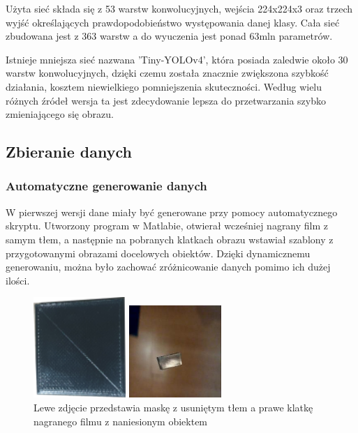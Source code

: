 Użyta sieć składa się z 53 warstw konwolucyjnych, wejścia 224x224x3 oraz trzech 
wyjść określających prawdopodobieństwo występowania danej klasy. 
Cała sieć zbudowana jest z 363 warstw a do wyuczenia jest ponad 63mln parametrów.

Istnieje mniejsza sieć nazwana 'Tiny-YOLOv4', która posiada zaledwie około 30 warstw konwolucyjnych, dzięki czemu
została znacznie zwiększona szybkość działania, kosztem niewielkiego pomniejszenia skuteczności. 
Według wielu różnych źródeł wersja ta jest zdecydowanie lepsza do przetwarzania szybko zmieniającego się obrazu.
\subsection{Zbieranie danych}
\subsubsection{Automatyczne generowanie danych}
W pierwszej wersji dane miały być generowane przy pomocy automatycznego skryptu.
Utworzony program w Matlabie, otwierał wcześniej nagrany film z samym tłem, a następnie 
na pobranych klatkach obrazu wstawiał szablony z przygotowanymi obrazami docelowych obiektów.
Dzięki dynamicznemu generowaniu, można było zachować zróżnicowanie danych pomimo ich dużej ilości.

\begin{figure}[H]
	\centering
	\begin{minipage}{0.45\textwidth}
		\centering
		\includegraphics[width=3.5cm]{pages/uczenie/img/maska_kw3.png}
	\end{minipage}
	\begin{minipage}{0.45\textwidth}
		\centering
		\includegraphics[width=3.5cm]{pages/uczenie/img/wynikGenerowania.jpg} %
	\end{minipage}
	\caption{Lewe zdjęcie przedstawia maskę z usuniętym tłem a prawe klatkę nagranego filmu z naniesionym obiektem}
	\label{rys:przykladoweGenerowanieDanych}
\end{figure}

